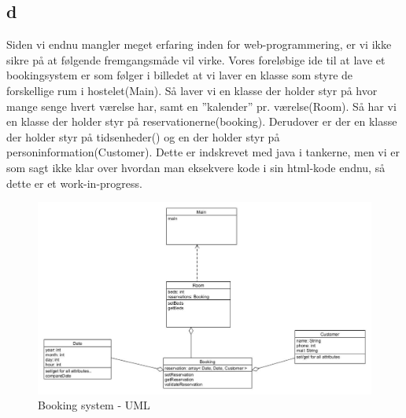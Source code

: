 \documentclass[12pt,a4paper]{article}
\begin{document}
\subsection{d}
Siden vi endnu mangler meget erfaring inden for web-programmering, er vi ikke sikre på at følgende fremgangsmåde vil virke. Vores foreløbige ide til at lave et bookingsystem er som følger i billedet at vi laver en klasse som styre de forskellige rum i hostelet(Main). Så laver vi en klasse der holder styr på hvor mange senge hvert værelse har, samt en ”kalender” pr. værelse(Room). Så har vi en klasse der holder styr på reservationerne(booking). Derudover er der en klasse der holder styr på tidsenheder() og en der holder styr på personinformation(Customer). Dette er indskrevet med java i tankerne, men vi er som sagt ikke klar over hvordan man eksekvere kode i sin html-kode endnu, så dette er et work-in-progress.\\
\begin{figure}[H]
\includegraphics[scale=0.4]{unfinished.jpg}
\caption{Booking system - UML}
\end{figure}
\end{document}

